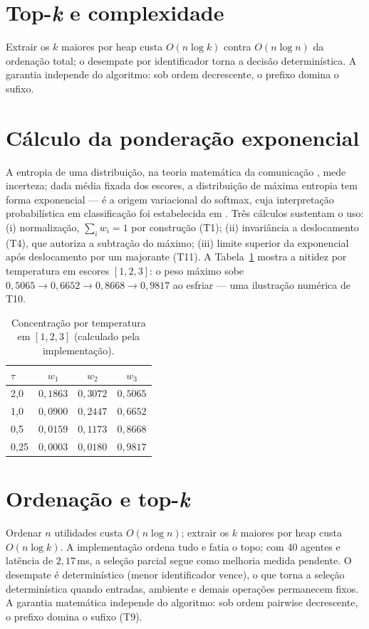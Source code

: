 \documentclass[12pt,openany,oneside,a4paper,brazil,chapter=TITLE]{abntex2}
\let\cite\citep
\begin{document}
\section{Top-\textit{k} e complexidade}
Extrair os $k$ maiores por heap custa $O(n\log k)$ contra $O(n\log n)$ da ordenação total; o desempate por identificador torna a decisão determinística. A garantia independe do algoritmo: sob ordem decrescente, o prefixo domina o sufixo.



\section{Cálculo da ponderação exponencial}
A entropia de uma distribuição, na teoria matemática da comunicação \cite{shannon1948}, mede incerteza; dada média fixada dos escores, a distribuição de máxima entropia tem forma exponencial \cite{jaynes1957} --- é a origem variacional do softmax, cuja interpretação probabilística em classificação foi estabelecida em \cite{bridle1990}. Três cálculos sustentam o uso: (i) normalização, $\sum_i w_i=1$ por construção (T1); (ii) invariância a deslocamento (T4), que autoriza a subtração do máximo; (iii) limite superior da exponencial após deslocamento por um majorante (T11). A Tabela~\ref{tab:temp} mostra a nitidez por temperatura em escores $[1,2,3]$: o peso máximo sobe $0{,}5065\to0{,}6652\to0{,}8668\to0{,}9817$ ao esfriar --- uma ilustração numérica de T10.
\begin{table}[htbp]
\fontsize{10}{12}\selectfont\SingleSpacing
\centering
\caption{Concentração por temperatura em $[1,2,3]$ (calculado pela implementação).}
\label{tab:temp}
\begin{tabular}{lccc}
\toprule
$\tau$ & $w_1$ & $w_2$ & $w_3$ \\
\midrule
2,0 & $0{,}1863$ & $0{,}3072$ & $0{,}5065$ \\
1,0 & $0{,}0900$ & $0{,}2447$ & $0{,}6652$ \\
0,5 & $0{,}0159$ & $0{,}1173$ & $0{,}8668$ \\
0,25 & $0{,}0003$ & $0{,}0180$ & $0{,}9817$ \\
\bottomrule
\end{tabular}
\end{table}
\section{Ordenação e top-\textit{k}}
Ordenar $n$ utilidades custa $O(n\log n)$; extrair os $k$ maiores por heap custa $O(n\log k)$. A implementação ordena tudo e fatia o topo; com 40 agentes e latência de $2{,}17$\,ms, a seleção parcial segue como melhoria medida pendente. O desempate é determinístico (menor identificador vence), o que torna a seleção determinística quando entradas, ambiente e demais operações permanecem fixos. A garantia matemática independe do algoritmo: sob ordem pairwise decrescente, o prefixo domina o sufixo (T9).
\end{document}

